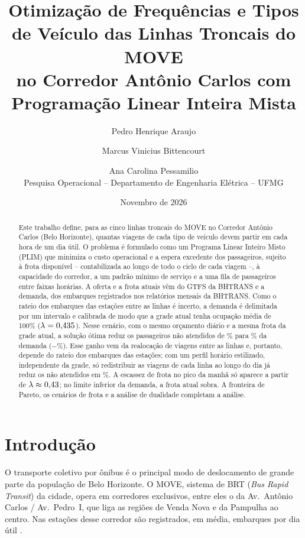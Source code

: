 \documentclass[11pt,a4paper]{article}
\title{Otimização de Frequências e Tipos de Veículo das Linhas Troncais do MOVE\\no Corredor Antônio Carlos com Programação Linear Inteira Mista}
\author{Pedro Henrique Araujo \and Marcus Vinicius Bittencourt \and Ana Carolina Pessamilio\\[4pt]
\small Pesquisa Operacional -- Departamento de Engenharia Elétrica -- UFMG}
\date{Novembro de 2026}
\begin{document}
\maketitle

\begin{abstract}
Este trabalho define, para as cinco linhas troncais do MOVE no Corredor Antônio
Carlos (Belo Horizonte), quantas viagens de cada tipo de veículo devem partir em
cada hora de um dia útil. O problema é formulado como um Programa Linear Inteiro
Misto (PLIM) que minimiza o custo operacional e a espera excedente dos
passageiros, sujeito à frota disponível -- contabilizada ao longo de todo o
ciclo de cada viagem --, à capacidade do corredor, a um padrão mínimo de serviço
e a uma fila de passageiros entre faixas horárias. A oferta e a frota atuais vêm
do GTFS da BHTRANS e a demanda, dos embarques registrados nos relatórios mensais
da BHTRANS. Como o rateio dos embarques das estações entre as linhas é incerto,
a demanda é delimitada por um intervalo e calibrada de modo que a grade atual
tenha ocupação média de 100\% ($\lambda=0{,}435$). Nesse cenário, com o
mesmo orçamento diário e a mesma frota da grade atual, a solução ótima reduz os
passageiros não atendidos de \moPctGTFS\% para \moPctOtimo\% da demanda
($-$\moReducaoPerda\%). Esse ganho vem da realocação de viagens entre as linhas
e, portanto, depende do rateio dos embarques das estações; com um perfil horário
estilizado, independente da grade, só redistribuir as viagens de cada linha ao
longo do dia já reduz os não atendidos em \moReducaoTipicoFixa\%. A escassez de
frota no pico da manhã só aparece a partir de
$\lambda\approx0{,}43$; no limite inferior da demanda, a frota atual
sobra. A fronteira de Pareto, os cenários de frota e a análise de dualidade
completam a análise.
\end{abstract}

\section{Introdução}

O transporte coletivo por ônibus é o principal modo de deslocamento de grande
parte da população de Belo Horizonte. O MOVE, sistema de BRT (\emph{Bus Rapid
Transit}) da cidade, opera em corredores exclusivos, entre eles o da Av.~Antônio
Carlos / Av.~Pedro~I, que liga as regiões de Venda Nova e da Pampulha ao centro.
Nas estações desse corredor são registrados, em média, \embarquesEstacoes{}
embarques por dia útil \citep{bhtrans2026}.
\end{document}
